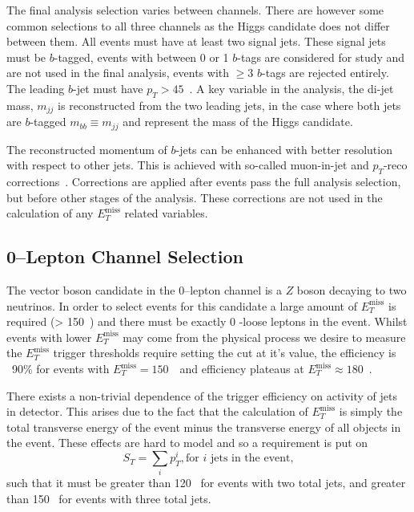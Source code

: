 The final analysis selection varies between channels. There are however some
common selections to all three channels as the Higgs candidate does not differ
between them. All events must have at least two signal jets. These signal jets
must be $b$-tagged, events with between 0 or 1 $b$-tags are considered for study
and are not used in the final analysis, events with $\ge3$ $b$-tags are rejected
entirely. The leading $b$-jet must have $p_T > 45$~\GeV. A key variable in the
analysis, the di-jet mass, $m_{jj}$ is reconstructed from the two leading jets,
in the case where both jets are $b$-tagged $m_{bb} \equiv m_{jj}$ and represent
the mass of the Higgs candidate.

The reconstructed momentum of $b$-jets can be enhanced with better resolution
with respect to other jets. This is achieved with so-called muon-in-jet and
$p_T$-reco corrections~\cite{VHObjectNote2019}. Corrections are applied after
events pass the full analysis selection, but before other stages of the
analysis. These corrections are not used in the calculation of any
$E_T^{\text{miss}}$ related variables.

\subsection{0--Lepton Channel Selection}
\label{sec:0lep-selection}

The vector boson candidate in the 0--lepton channel is a $Z$ boson decaying to
two neutrinos. In order to select events for this candidate a large amount of
$E_T^{\text{miss}}$ is required (> 150~\GeV) and there must be exactly 0
\VH-loose leptons in the event. Whilst events with lower $E_T^{\text{miss}}$
may come from the physical process we desire to measure the $E_T^{\text{miss}}$
trigger thresholds require setting the cut at it's value, the efficiency is
~90\% for events with $E_T^{\text{miss}} = 150$~\GeV\ and efficiency plateaus at
$E_T^{\text{miss}} \approx 180$~\GeV.

There exists a non-trivial dependence of the trigger efficiency on activity of
jets in detector. This arises due to the fact that the calculation of
$E_T^{\text{miss}}$ is simply the total transverse energy of the event minus the
transverse energy of all objects in the event. These effects are hard to model
and so a requirement is put on
\begin{equation}
  S_T = \sum_i p_T^i, \text{for } i \text{ jets in the event,}
\end{equation}
such that it must be greater than 120 \GeV\ for events with two total jets, and
greater than 150 \GeV\ for events with three total jets.

